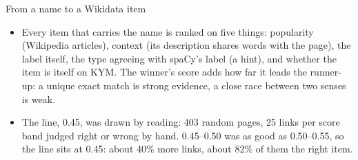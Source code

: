 \begin{frame}{From a name to a Wikidata item}
{\begin{itemize}
    \item Every item that carries the name is ranked on five things: popularity (Wikipedia
      articles), context (its description shares words with the page), the label itself, the
      type agreeing with spaCy's label (a hint), and whether the item is itself on KYM. The
      winner's score adds how far it leads the runner-up: a unique exact match is strong evidence,
      a close race between two senses is weak.
    \item The line, 0.45, was drawn by reading: 403 random pages, 25 links per score band judged
      right or wrong by hand. 0.45--0.50 was as good as 0.50--0.55, so the line sits at 0.45:
      about 40\% more links, about 82\% of them the right item.
  \end{itemize}}
\end{frame}

